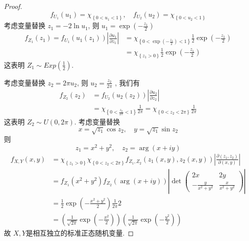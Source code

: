 \documentclass[../main.tex]{subfiles}
\begin{document}
\begin{proof}
  \[
  f_{U_1}\left( u_1 \right)= \chi _{\left\{ 0< u_1< 1 \right\}},\quad f_{U_2}\left( u_2 \right)= \chi _{\left\{ 0< u_2< 1 \right\}}  
  \] 考虑变量替换 \(  z_1= -2\ln u_1  \), 则 \(  u_1= \exp \left( -\frac{z_1 }{2 }  \right)   \)  \[
  \begin{aligned}
  f_{Z_1}\left( z_1 \right)=  f_{U_1}\left( u_1\left( z_1 \right)  \right) \left| \frac{\partial u_1  }{\partial z_1} \right|&= \chi _{\left\{ 0< \exp \left( -\frac{z_1 }{2 }  \right)< 1  \right\}} \frac{1 }{2 } \exp \left( -\frac{z_1 }{2 }  \right)  \\ 
   &  =\chi _{\left\{ z_1> 0 \right\}}\frac{1 }{2 } \exp \left( -\frac{z_1 }{2 }  \right)    
  \end{aligned}
  \]这表明 \(  Z_1\sim Exp\left( \frac{1}{2} \right)   \). 
  
  考虑变量替换 \(  z_2= 2 \pi u_2  \), 则 \(  u_2= \frac{z_2 }{2 \pi  }   \)  , 我们有 \[\begin{aligned}
  f_{Z_2}\left( z_2 \right)&= f_{U_2}\left( u_2\left( z_2 \right)  \right) \left| \frac{\partial u_2  }{\partial z_2} \right|   \\ 
   &= \chi _{\left\{ 0< \frac{z_2 }{2 \pi  }< 1  \right\}} \frac{1 }{2 \pi  } = \chi _{\left\{ 0< z_2< 2 \pi  \right\}}\frac{1 }{2 \pi  } 
  \end{aligned}
  \]这表明 \(  Z_2\sim U\left( 0,2 \pi  \right)   \). 
   考虑变量替换 \[
   x= \sqrt{z_1}\cos z_2,\quad y= \sqrt{z_1}\sin z_2
   \]则 \[
   z_1= x^{2}+ y^{2}, \quad z_2= \operatorname{arg}\left( x+ iy \right) 
   \]\[
  \begin{aligned}
   f_{X,Y}\left( x,y \right)&=\chi _{\left\{ z_1> 0 \right\}}\chi _{\left\{ 0< z_2< 2 \pi  \right\}} f_{Z_1,Z_2}\left( z_1\left( x,y \right),z_2\left( x,y \right)   \right)   \left| \frac{\partial \left( z_1,z_2 \right) }{\partial \left( x,y \right) } \right|  \\ 
    &= f_{Z_1}\left( x^{2}+ y^{2} \right)f_{Z_2}\left(\operatorname{arg}\left( x+ iy \right)   \right) \left| \det \begin{pmatrix} 
        2x&2y\\ 
         - \frac{y}{x^{2}+ y^{2} } &\frac{x }{x^{2}+ y^{2} } 
    \end{pmatrix}  \right|  \\ 
     &= \frac{1 }{ 2} \exp \left( -\frac{x^{2}+ y^{2} }{2 }  \right)\frac{1 }{2 \pi  } 2 \\ 
      &= \left( \frac{1 }{\sqrt{2 \pi } }\exp \left( -\frac{x^{2} }{2 }  \right)   \right)   \left( \frac{1 }{\sqrt{2 \pi } }\exp \left( -\frac{y^{2} }{2 }  \right)   \right) 
  \end{aligned}
   \]故 \(  X,Y  \)是相互独立的标准正态随机变量. 
\end{proof}
\end{document}

